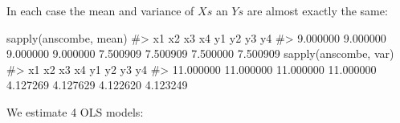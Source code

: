 \documentclass[
  letterpaper,
  DIV=11,
  numbers=noendperiod]{scrreprt}
\newenvironment{Shaded}{\begin{snugshade}}{\end{snugshade}}
\newcommand{\CommentTok}[1]{\textcolor[rgb]{0.37,0.37,0.37}{#1}}
\newcommand{\FunctionTok}[1]{\textcolor[rgb]{0.28,0.35,0.67}{#1}}
\newcommand{\NormalTok}[1]{\textcolor[rgb]{0.00,0.23,0.31}{#1}}
\begin{document}
In each case the mean and variance of \(Xs\) an \(Ys\) are almost
exactly the same:

\begin{Shaded}
\begin{Highlighting}[]
\FunctionTok{sapply}\NormalTok{(anscombe, mean)}
\CommentTok{\#\textgreater{}       x1       x2       x3       x4       y1       y2       y3       y4 }
\CommentTok{\#\textgreater{} 9.000000 9.000000 9.000000 9.000000 7.500909 7.500909 7.500000 7.500909}
\FunctionTok{sapply}\NormalTok{(anscombe, var)}
\CommentTok{\#\textgreater{}        x1        x2        x3        x4        y1        y2        y3        y4 }
\CommentTok{\#\textgreater{} 11.000000 11.000000 11.000000 11.000000  4.127269  4.127629  4.122620  4.123249}
\end{Highlighting}
\end{Shaded}

We estimate 4 OLS models:
\end{document}
